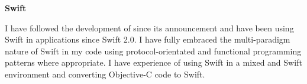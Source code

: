 \textbf{Swift}

I have followed the development of  since its announcement and have
been using Swift in applications since Swift 2.0. I have fully embraced the
multi-paradigm nature of Swift in my code using protocol-orientated and
functional programming patterns where appropriate. I have experience of using
Swift in a mixed  and Swift environment and converting
Objective-C code to Swift.

